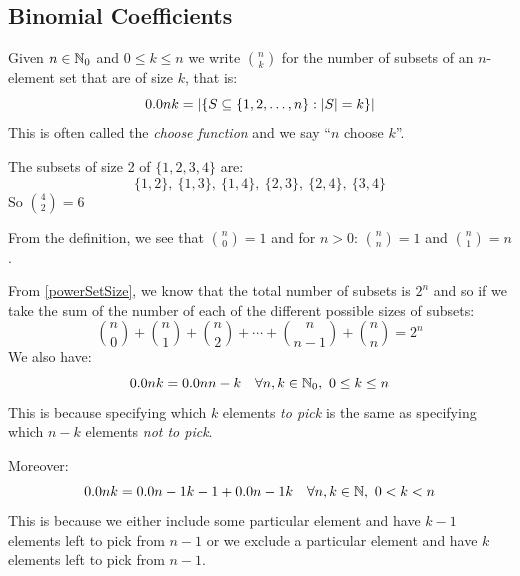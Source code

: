 \documentclass[../main.tex]{subfiles}
\begin{document}
\subsection{Binomial Coefficients}
\begin{definition}
  Given $n \in \mathbb{N}_0$ and $0 \leq k \leq n$ we write $\binom{n}{k}$ for the number of subsets of an $n$-element set that are of size $k$, that is:
  \[
    \binom{n}{k} = \abs{\{S \subseteq \{1, 2, \ldots, n\} : |S| = k\}}
  \]
  This is often called the \textit{choose function} and we say ``$n$ choose $k$''.
\end{definition}
\begin{example}
  The subsets of size 2 of $\{1, 2, 3, 4\}$ are:
  \[
    \{1, 2\},\ \{1, 3\},\ \{1, 4\},\ \{2, 3\},\ \{2, 4\},\ \{3, 4\}
  \]
  So $\binom{4}{2} = 6$
\end{example}
From the definition, we see that $\binom{n}{0} = 1$ and for $n > 0$: $\binom{n}{n} = 1$ and $\binom{n}{1} = n$.

From \cref{powerSetSize}, we know that the total number of subsets is $2^{n}$ and so if we take the sum of the number of each of the different possible sizes of subsets:
\[
  \binom{n}{0} + \binom{n}{1} + \binom{n}{2} + \cdots + \binom{n}{n-1} + \binom{n}{n} = 2^{n}
\]
We also have:
\[
  \binom{n}{k} = \binom{n}{n - k} \quad \forall n, k \in \N_0,\ 0 \leq k \leq n
\]
This is because specifying which $k$ elements \textit{to pick} is the same as specifying which $n - k$ elements \textit{not to pick}.

Moreover:
\[
  \binom{n}{k} = \binom{n - 1}{k - 1} + \binom{n - 1}{k} \quad \forall n, k  \in \N,\ 0 < k < n
\]
This is because we either include some particular element and have $k - 1$ elements left to pick from $n - 1$ or we exclude a particular element and have $k$ elements left to pick from $n - 1$.
\end{document}
